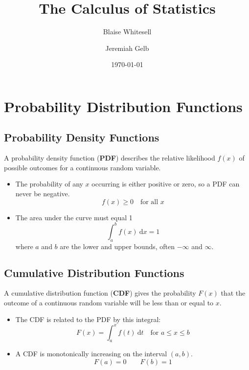 \documentclass[12pt,letterpaper]{article}
\title{\Huge{The Calculus of Statistics}}
\author{Blaise Whitesell \and Jeremiah Gelb}
\date{\today}
\begin{document}
\newcommand{\bdef}[1]{\textbf{#1}} %
\newcommand{\dx}{\:\mathrm{d}x} %
\newcommand{\dt}{\:\mathrm{d}t} %
\newcommand{\dth}{\:\mathrm{d}\theta} %
\theoremstyle{remark} \newtheorem{problem}{Problem}
\maketitle
\vspace{2 em}
\section{Probability Distribution Functions}
\subsection{Probability Density Functions}
A probability density function (\bdef{PDF}) describes
the relative likelihood $f(x)$ of possible outcomes
for a continuous random variable.
\begin{itemize}
\item The probability of any $x$ occurring is either positive or zero,
so a PDF can never be negative.
\begin{equation*}
f(x) \geq 0 \quad \text{for all }x
\end{equation*}
\item The area under the curve must equal 1
\begin{equation*}
\int_a^b f(x)\dx = 1
\end{equation*}
where $a$ and $b$ are the lower and upper bounds,
often $-\infty$ and $\infty$.
\end{itemize}
\subsection{Cumulative Distribution Functions}
A cumulative distribution function (\bdef{CDF}) gives
the probability $F(x)$ that the outcome of a
continuous random variable will be less than or equal to $x$.
\begin{itemize}
\item The CDF is related to the PDF by this integral:
\begin{equation*}
F(x) = \int_a^x f(t) \dt \quad \text{for } a \leq x \leq b
\end{equation*}
\item A CDF is monotonically increasing on the interval $(a,b)$.
\begin{equation*}
F(a) = 0 \qquad F(b) = 1
\end{equation*}
\end{itemize}
\end{document}
